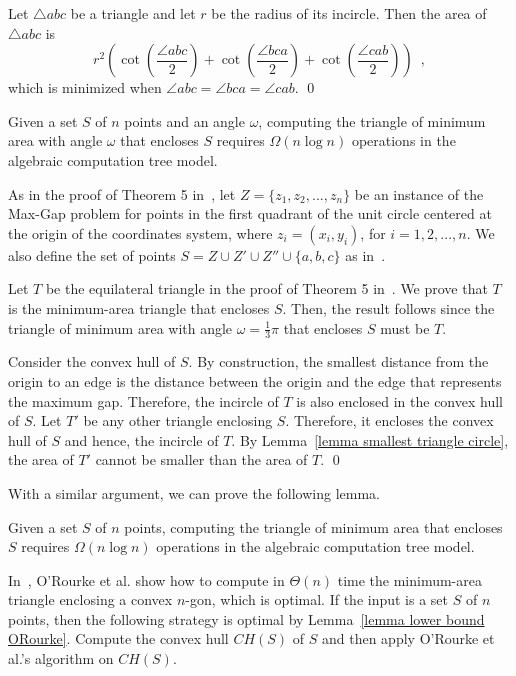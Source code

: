 \documentclass[11pt, oneside]{article}
\begin{document}
\proof Let $\triangle abc$ be a triangle
and let $r$ be the radius of its incircle.
Then the area of $\triangle abc$ is
$$r^2\left(\cot\left(\frac{\angle abc}{2}\right)+\cot\left(\frac{\angle bca}{2}\right)+\cot\left(\frac{\angle cab}{2}\right)\right) \enspace,$$
which is minimized when $\angle abc = \angle bca = \angle cab$.
\qed

\begin{proposition}
Given a set $S$ of $n$ points and an angle $\omega$,
computing the triangle of minimum area with angle $\omega$ 
that encloses $S$
requires $\Omega(n \log n)$ operations in the algebraic computation tree model.
\end{proposition}

\proof
As in the proof of Theorem 5 in~\cite{DBLP:journals/ijcga/BoseMSS11},
let $Z = \{z_1, z_2,...,z_n\}$ be an instance of the Max-Gap
problem for points in the first quadrant of the unit circle centered at the origin of
the coordinates system,
where $z_i = (x_i,y_i)$,
for $i = 1,2,... ,n$.
We also define the set of points $S=Z \cup Z' \cup Z'' \cup\{a,b,c\}$
as in~\cite{DBLP:journals/ijcga/BoseMSS11}.

Let $T$ be the equilateral triangle in the proof of Theorem 5 in~\cite{DBLP:journals/ijcga/BoseMSS11}.
We prove that $T$
is the minimum-area triangle that encloses $S$.
Then,
the result follows since
the triangle of minimum area with angle $\omega=\frac{1}{3}\pi$
that encloses $S$ must be $T$.

Consider the convex hull of $S$.
By construction,
the smallest distance from the origin to an edge is
the distance between the origin and the edge that represents the maximum gap.
Therefore,
the incircle of $T$ is also enclosed in the convex hull of $S$.
Let $T'$ be any other triangle enclosing $S$.
Therefore,
it encloses the convex hull of $S$ and hence,
the incircle of $T$.
By Lemma~\ref{lemma smallest triangle circle},
the area of $T'$ cannot be smaller than the area of $T$.
\qed

With a similar argument,
we can prove the following lemma.
\begin{lemma}
\label{lemma lower bound ORourke}
Given a set $S$ of $n$ points,
computing the triangle of minimum area that encloses $S$
requires $\Omega(n \log n)$ operations in the algebraic computation tree model.
\end{lemma}

In~\cite{DBLP:journals/jal/ORourkeAMB86},
O'Rourke et al. show how to compute in $\Theta(n)$ time
the minimum-area triangle enclosing a convex $n$-gon,
which is optimal.
If the input is a set $S$ of $n$ points,
then the following strategy is optimal
by Lemma~\ref{lemma lower bound ORourke}.
Compute the convex hull $CH(S)$ of $S$
and then apply O'Rourke et al.'s algorithm on $CH(S)$.
\end{document}
